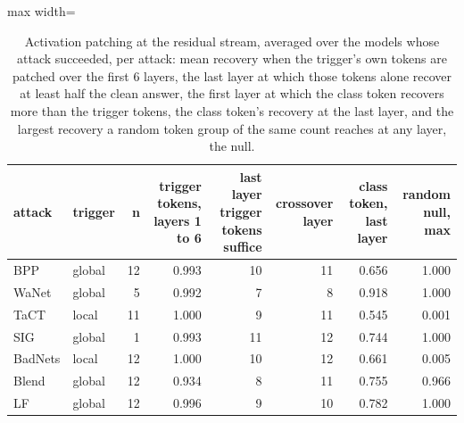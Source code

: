 \begin{table}[htbp]
\centering
\small
\caption{Activation patching at the residual stream, averaged over the models whose attack succeeded, per attack: mean recovery when the trigger's own tokens are patched over the first 6 layers, the last layer at which those tokens alone recover at least half the clean answer, the first layer at which the class token recovers more than the trigger tokens, the class token's recovery at the last layer, and the largest recovery a random token group of the same count reaches at any layer, the null.}
\label{tab:activation-patching}
\begin{adjustbox}{max width=\linewidth}
\begin{tabular}{llrrrrrr}
\toprule
attack & trigger & n & trigger tokens, layers 1 to 6 & last layer trigger tokens suffice & crossover layer & class token, last layer & random null, max \\
\midrule
BPP & global & 12 & 0.993 & 10 & 11 & 0.656 & 1.000 \\
WaNet & global & 5 & 0.992 & 7 & 8 & 0.918 & 1.000 \\
TaCT & local & 11 & 1.000 & 9 & 11 & 0.545 & 0.001 \\
SIG & global & 1 & 0.993 & 11 & 12 & 0.744 & 1.000 \\
BadNets & local & 12 & 1.000 & 10 & 12 & 0.661 & 0.005 \\
Blend & global & 12 & 0.934 & 8 & 11 & 0.755 & 0.966 \\
LF & global & 12 & 0.996 & 9 & 10 & 0.782 & 1.000 \\
\bottomrule
\end{tabular}
\end{adjustbox}
\end{table}
